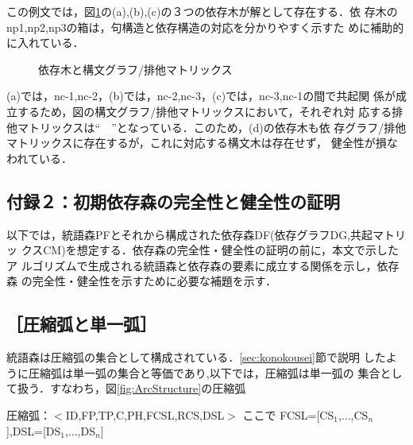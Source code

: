\begin{comment}
\begin{figure}[h]
 \begin{center}
  \epsfile{file=\myfigdir/DF付録１−１.eps,scale=0.6}
 \end{center}
\myfiglabelskip
\end{figure}
\end{comment}

この例文では，図\ref{fig:SynGraphBadExample}の(a),(b),(c)の３つの依存木が解として存在する．依
存木のnp1,np2,np3の箱は，句構造と依存構造の対応を分かりやすく示すた
めに補助的に入れている．

\begin{figure}[h]
 \begin{center}
 \end{center}
\myfiglabelskip
\caption{依存木と構文グラフ/排他マトリックス}
\label{fig:SynGraphBadExample}
\end{figure}

(a)では，nc-1,nc-2，(b)では，nc-2,nc-3，(c)では，nc-3,nc-1の間で共起関
係が成立するため，図の構文グラフ/排他マトリックスにおいて，それぞれ対
応する排他マトリックスは``　''となっている．このため，(d)の依存木も依
存グラフ/排他マトリックスに存在するが，これに対応する構文木は存在せず，
健全性が損なわれている．


\normalsize
\subsection*{付録２：初期依存森の完全性と健全性の証明}
\small
以下では，統語森PFとそれから構成された依存森DF(依存グラフDG,共起マトリッ
クスCM)を想定する．依存森の完全性・健全性の証明の前に，本文で示したア
ルゴリズムで生成される統語森と依存森の要素に成立する関係を示し，依存森
の完全性・健全性を示すために必要な補題を示す．

\subsection*{［圧縮弧と単一弧］}

統語森は圧縮弧の集合として構成されている．\ref{sec:konokousei}節で説明
したように圧縮弧は単一弧の集合と等価であり,以下では，圧縮弧は単一弧の
集合として扱う．すなわち，図\ref{fig:ArcStructure}の圧縮弧

\mygapskip
圧縮弧：$<$ID,FP,TP,C,PH,FCSL,RCS,DSL$>$ ここで FCSL=[CS$_1$,${\ldots}$,CS$_n$],DSL=[DS$_1$,${\ldots}$,DS$_n$]
\mygapskip

